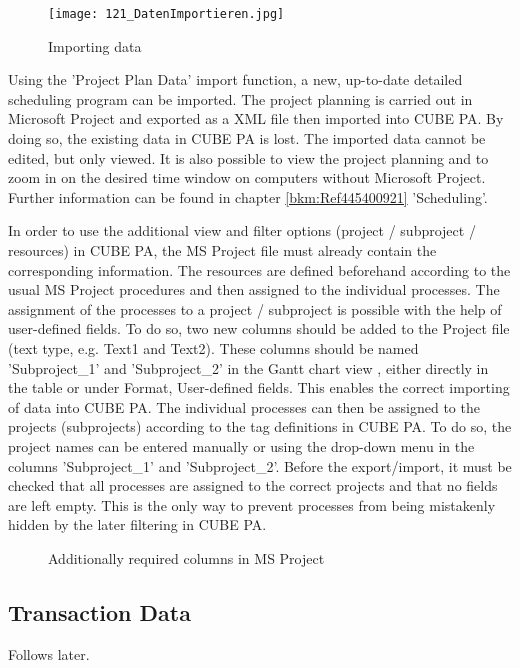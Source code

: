 \begin{figure}
\vspace{-15pt}
\texttt{[image: 121\_DatenImportieren.jpg]}
\caption{Importing data}
\end{figure}
Using the 'Project Plan Data' import function, a new, up-to-date detailed scheduling program can be imported. The project planning is carried out in Microsoft Project and exported as a XML file then imported into CUBE PA. By doing so, the existing data in CUBE PA is lost. The imported data cannot be edited, but only viewed. It is also possible to view the project planning and to zoom in on the desired time window on computers without Microsoft Project. Further information can be found in chapter \ref{bkm:Ref445400921} 'Scheduling'.

\vspace{\baselineskip}

In order to use the additional view and filter options (project / subproject / resources) in CUBE PA, the MS Project file must already contain the corresponding information. The resources are defined beforehand according to the usual MS Project procedures and then assigned to the individual processes. The assignment of the processes to a project / subproject is possible with the help of user-defined fields. To do so, two new columns should be added to the Project file (text type, e.g. Text1 and Text2). These columns should be named 'Subproject\_1' and 'Subproject\_2' in the Gantt chart view , either directly in the table or under Format, User-defined fields. This enables the correct importing of data into CUBE PA. The individual processes can then be assigned to the projects (subprojects) according to the tag definitions in CUBE PA. To do so, the project names can be entered manually or using the drop-down menu in the columns 'Subproject\_1' and 'Subproject\_2'. Before the export/import, it must be checked that all processes are assigned to the correct projects and that no fields are left empty. This is the only way to prevent processes from being mistakenly hidden by the later filtering in CUBE PA.

\begin{figure}[H]
\caption{Additionally required columns in MS Project}
\end{figure}

\subsection{Transaction Data}

Follows later.
